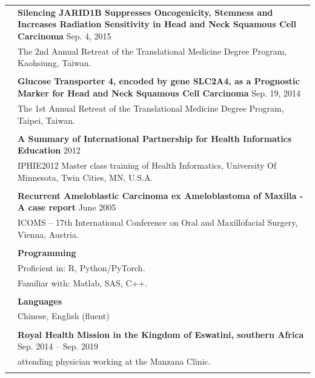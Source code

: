 \documentclass[letterpaper, 11pt]{article}
\begin{document}
\begin{longtable}{p{1.3in}p{4.8in}}
& \textbf{Silencing JARID1B Suppresses
Oncogenicity, Stemness and Increases Radiation Sensitivity in Head and
Neck Squamous Cell Carcinoma} \hfill Sep. 4, 2015 \\
& The 2nd Annual Retreat of the
Translational Medicine Degree Program, Kaohsiung, Taiwan. \\
& \\


& \textbf{Glucose Transporter 4, encoded by gene
SLC2A4, as a Prognostic Marker for Head and Neck Squamous Cell
Carcinoma} \hfill Sep. 19, 2014 \\
& The 1st Annual Retreat of the Translational Medicine Degree Program, Taipei, Taiwan. \\
& \\


& \textbf{A Summary of International Partnership for Health Informatics Education} \hfill  2012 \\
& IPHIE2012 Master
class training of Health Informatics, University Of Minnesota, Twin
Cities, MN, U.S.A. \\
& \\

& \textbf{Recurrent Ameloblastic Carcinoma ex
Ameloblastoma of Maxilla - A case report} \hfill June 2005 \\
& ICOMS – 17th International
Conference on Oral and Maxillofacial Surgery, Vienna, Austria. \\
& \\




{\color{OliveGreen}{Skills}} 
& \textbf{Programming}\\
& Proficient in: R, Python/PyTorch. \\
& Familiar with: Matlab, SAS, C++. \\
& \\

& \textbf{Languages} \\
& Chinese, English (fluent) \\
& \\


\color{OliveGreen}{Service and outreach by TMU} %
& \textbf{Royal Health Mission in the Kingdom of Eswatini, southern Africa} \hfill Sep. 2014 -- Sep. 2019 \\
& attending physician working at the Manzana Clinic. \\
& \\


\end{longtable}
\end{document}
